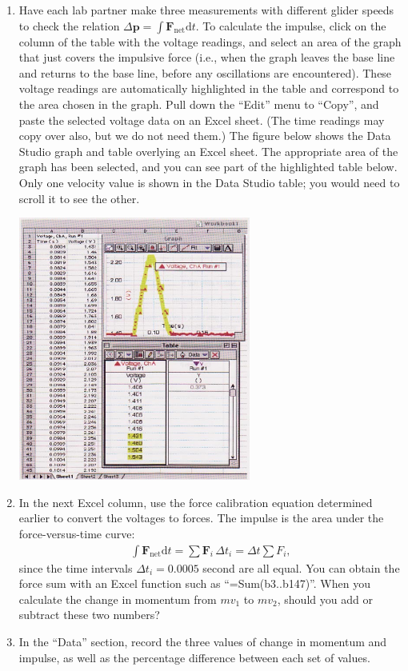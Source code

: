 \begin{enumerate}[label=\arabic*.]
\item Have each lab partner make three measurements with different glider speeds to check the relation \(\Delta\textbf{p} = \int \textbf{F}_{\textrm{net}} \textrm{d}t\).  To calculate the impulse, click on the column of the table with the voltage readings, and select an area of the graph that just covers the impulsive force (i.e., when the graph leaves the base line and returns to the base line, before any oscillations are encountered).  These voltage readings are automatically highlighted in the table and correspond to the area chosen in the graph.  Pull down the ``Edit'' menu to ``Copy'', and paste the selected voltage data on an Excel sheet.  (The time readings may copy over also, but we do not need them.)  The figure below shows the Data Studio graph and table overlying an Excel sheet.  The appropriate area of the graph has been selected, and you can see part of the highlighted table below.  Only one velocity value is shown in the Data Studio table; you would need to scroll it to see the other.
\begin{center} \includegraphics*[width=0.6\textwidth]{imgs/6labs/6Alab/6Aexp5/IMG_002_sm_fx.jpg} \end{center}

\item In the next Excel column, use the force calibration equation determined earlier to convert the voltages to forces.  The impulse is the area under the force-versus-time curve:
\begin{align} \int \textbf{F}_{\textrm{net}} \textrm{d}t = \sum \textbf{F}_i \,\Delta t_i = \Delta t \sum F_i, \end{align}
since the time intervals \(\Delta t_i = 0.0005\) second are all equal.  You can obtain the force sum with an Excel function such as ``=Sum(b3..b147)''.  When you calculate the change in momentum from \(mv_1\) to \(mv_2\), should you add or subtract these two numbers?

\item In the ``Data'' section, record the three values of change in momentum and impulse, as well as the percentage difference between each set of values.

\end{enumerate}

